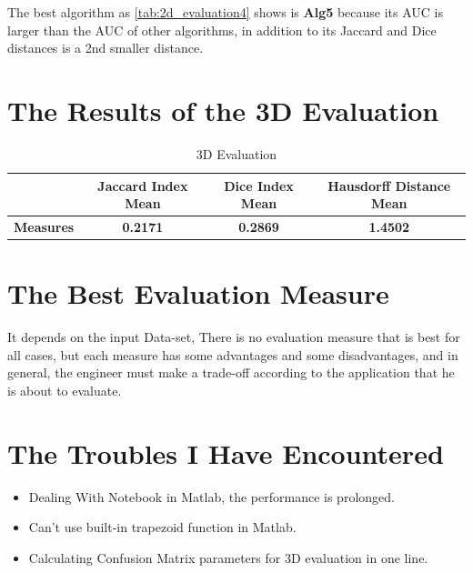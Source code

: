\documentclass[a4paper, 11pt]{article}
\begin{document}
The best algorithm as \ref{tab:2d_evaluation4} shows is \textbf{Alg5} because its AUC is larger than the AUC of other algorithms, in addition to its Jaccard and Dice distances is a 2nd smaller distance.


\pagebreak

\section*{The Results of the 3D Evaluation}

\begin{table}[h!]
\centering
\begin{tabular}{|c|c|c|c|}
\hline
{} & \textbf{Jaccard Index Mean} & \textbf{Dice Index Mean} & \textbf{Hausdorff Distance Mean} \\
\hline
\textbf{Measures} & \textbf{0.2171} & \textbf{0.2869} & \textbf{1.4502} \\
\hline
\end{tabular}
\caption{\label{tab:2d_evaluation} 3D Evaluation}
\end{table}

\section*{The Best Evaluation Measure}

 It depends on the input Data-set, There is no evaluation measure that is best for all cases, but each measure has some advantages and some disadvantages, and in general, the engineer must make a trade-off according to the application that he is about to evaluate.

\section*{The Troubles I Have Encountered}

\begin{itemize}
    \item Dealing With Notebook in Matlab, the performance is prolonged.
    \item Can't use built-in trapezoid function in Matlab.
    \item Calculating Confusion Matrix parameters for 3D evaluation in one line.
\end{itemize}




\end{document}

